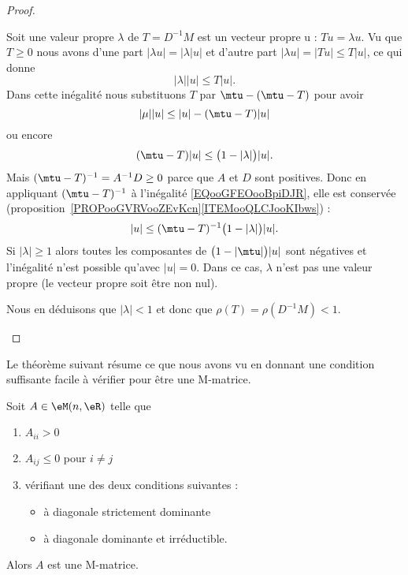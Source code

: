 \begin{proof}
\begin{subproof}
		Soit une valeur propre \( \lambda\) de \( T=D^{-1}M\) est un vecteur propre u : \( Tu=\lambda u\). Vu que \( T\geq 0\) nous avons d'une part \( | \lambda u |=| \lambda | u |\) et d'autre part \( | \lambda u |=| Tu |\leq T| u |\), ce qui donne
		\begin{equation}
			| \lambda | |u |\leq T| u |.
		\end{equation}
		Dans cette inégalité nous substituons \( T\) par \( \mtu-(\mtu-T)\) pour avoir
		\begin{equation}
			| \mu | |u |\leq | u |-(\mtu-T)| u |
		\end{equation}
		ou encore
		\begin{equation}        \label{EQooGFEOooBpiDJR}
			(\mtu-T)| u |\leq \big( 1-| \lambda | \big)| u |.
		\end{equation}
		Mais \( (\mtu-T)^{-1}=A^{-1}D\geq 0\) parce que \( A\) et \( D\) sont positives. Donc en appliquant \( (\mtu-T)^{-1}\) à l'inégalité \eqref{EQooGFEOooBpiDJR}, elle est conservée (proposition~\ref{PROPooGVRVooZEvKcn}\ref{ITEMooQLCJooKIbws}) :
		\begin{equation}
			| u |\leq (\mtu-T)^{-1}\big( 1-| \lambda | \big)| u |.
		\end{equation}
		Si \( | \lambda |\geq 1\) alors toutes les composantes de \( \big( 1-| \mtu | \big)| u |\) sont négatives et l'inégalité n'est possible qu'avec \( | u |=0\). Dans ce cas, \( \lambda\) n'est pas une valeur propre (le vecteur propre soit être non nul).

		Nous en déduisons que \( | \lambda |<1\) et donc que \( \rho(T)=\rho(D^{-1}M)<1\).
	\end{subproof}
\end{proof}

Le théorème suivant résume ce que nous avons vu en donnant une condition suffisante facile à vérifier pour être une M-matrice.
\begin{theorem}     \label{THOooLZGSooSevggj}
	Soit \( A\in \eM(n,\eR)\) telle que
	\begin{enumerate}
		\item
		      \( A_{ii}>0\)
		\item
		      \( A_{ij}\leq 0\) pour \( i\neq j\)
		\item
		      vérifiant une des deux conditions suivantes :
		      \begin{itemize}
			      \item à diagonale strictement dominante
			      \item à diagonale dominante et irréductible.
		      \end{itemize}
	\end{enumerate}
	Alors \( A\) est une M-matrice.
\end{theorem}

